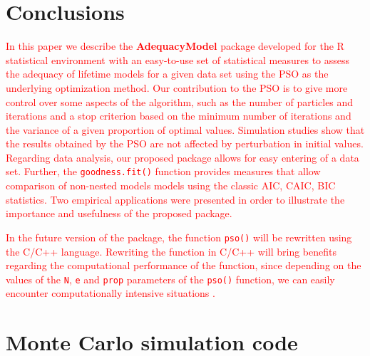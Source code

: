\documentclass[10pt,letterpaper]{article}
\begin{document}
\section{Conclusions}

\textcolor{red}{In this paper we describe the \textbf{AdequacyModel} package developed for the \textsc{R} statistical environment
with an easy-to-use set of statistical measures to assess the adequacy of lifetime models for a given data set using the PSO as the underlying optimization method.
Our contribution to the PSO is to give more control over some aspects of the algorithm,
such as the number of particles and iterations and a stop criterion based on the minimum number of iterations
and the variance of a given proportion of optimal values.
Simulation studies show that the results obtained by the PSO are not affected by perturbation in initial values.
Regarding data analysis, our proposed package allows for easy entering of a data set.
Further, the \texttt{goodness.fit()} function provides measures that allow comparison of non-nested models models using the classic AIC, CAIC, BIC statistics.
Two empirical applications were presented in order to illustrate the importance and usefulness of the proposed package.}

\textcolor{red}{In the future version of the package, the function \texttt{pso()} will be rewritten using the \textsc{C}/\textsc{C++} language. Rewriting the function in \textsc{C}/\textsc{C++} will bring benefits regarding the computational performance of the function, since depending on the values of the \texttt{N}, \texttt{e} and \texttt{prop} parameters of the \texttt{pso()} function, we can easily encounter computationally intensive situations .}







\appendix


\section{Monte Carlo simulation code}
\label{code:simulation_mc}
\end{document}
